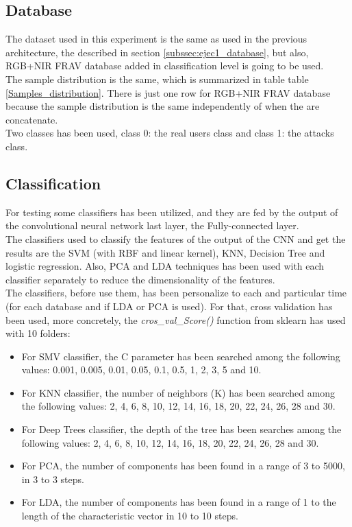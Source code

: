 \subsection{Database}
The dataset used in this experiment is the same as used in the previous architecture, the described in section \ref{subssec:ejec1_database}, but also, RGB+NIR FRAV database added in classification level is going to be used.\\

The sample distribution is the same, which is summarized in table table \ref{Samples_distribution}. There is just one row for RGB+NIR FRAV database because the sample distribution is the same independently of when the are concatenate.\\

Two classes has been used, class 0: the real users class and class 1: the attacks class.

\subsection{Classification}
For testing some classifiers has been utilized, and they are fed by the output of the convolutional neural network last layer, the Fully-connected layer.\\

The classifiers used to classify the features of the output of the CNN and get the results are the SVM (with RBF and linear kernel), KNN, Decision Tree and logistic regression. Also, PCA and LDA techniques has been used with each classifier separately to reduce the dimensionality of the features.\\

The classifiers, before use them, has been personalize to each and particular time (for each database and if LDA or PCA is used). For that, cross validation has been used, more concretely, the \textit{cros\_val\_Score()} function from sklearn has used with 10 folders:
\begin{itemize}
\item For SMV classifier, the C parameter has been searched among the following values: 0.001, 0.005, 0.01, 0.05, 0.1, 0.5, 1, 2, 3, 5 and 10.
\item For KNN classifier, the number of neighbors (K) has been searched among the following values: 2, 4, 6, 8, 10, 12, 14, 16, 18, 20, 22, 24, 26, 28 and 30.
\item For Deep Trees classifier, the depth of the tree has been searches among the following values: 2, 4, 6, 8, 10, 12, 14, 16, 18, 20, 22, 24, 26, 28 and 30.
\item For PCA, the number of components has been found in a range of 3 to 5000, in 3 to 3 steps.
\item For LDA, the number of components has been found in a range of 1 to the length of the characteristic vector in 10 to 10 steps.
\end{itemize}

\clearpage

